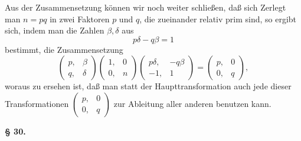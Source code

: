 Aus der Zusammensetzung
können wir noch weiter schließen, daß sich  Zerlegt man $n = pq$ in zwei Faktoren
 $p$ und $q$, die zueinander relativ prim sind, so ergibt sich,
indem man die Zahlen $\beta, \delta$ aus
\[
p\delta - q\beta = 1
\]
bestimmt, die Zusammensetzung
\[
\begin{pmatrix}p, & \beta\\q, & \delta\end{pmatrix}\begin{pmatrix}1, & 0\\0, & n\end{pmatrix}\begin{pmatrix}p\delta, & -q\beta\\-1, & 1\end{pmatrix} = \begin{pmatrix}p, & 0\\0, & q\end{pmatrix},
\]
woraus zu ersehen ist, daß man statt der Haupttransformation
auch jede dieser Transformationen $\begin{pmatrix}p, & 0\\0, & q\end{pmatrix}$ zur Ableitung aller
anderen benutzen kann.

\begin{center}
\textbf{§ 30. }
\end{center}

